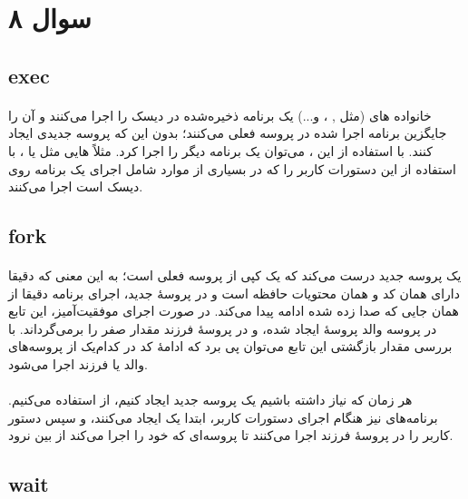 \documentclass{article}
\begin{document}
	\section*{سوال ۸}
	\subsection*{exec}
	\paragraph*{}
	خانواده
	های
	(مثل
	,
	،
	و...)
	یک برنامه ذخیره‌شده در دیسک را اجرا می‌کنند و آن را جایگزین برنامه اجرا شده در  پروسه فعلی می‌کنند؛ بدون این که پروسه جدیدی ایجاد کنند. با استفاده از این
	،
	می‌توان یک برنامه دیگر را اجرا کرد. مثلاً
	هایی
	مثل
	یا
	،
	با استفاده از این
	دستورات کاربر را که در بسیاری از موارد شامل اجرای یک برنامه روی دیسک است اجرا می‌کنند.

	\subsection*{fork}
	\paragraph*{}
	یک پروسه جدید درست می‌کند که یک کپی از پروسه فعلی است؛ به این معنی که دقیقا دارای همان کد و همان محتویات حافظه است و در پروسهٔ جدید، اجرای برنامه دقیقا از همان جایی که
	صدا زده شده ادامه پیدا می‌کند. در صورت اجرای موفقیت‌آمیز، این تابع در پروسه والد
	پروسهٔ ایجاد شده، و در پروسهٔ فرزند مقدار صفر را برمی‌گرداند. با بررسی مقدار بازگشتی این تابع می‌توان پی برد که ادامهٔ کد در کدام‌یک از پروسه‌های والد یا فرزند اجرا می‌شود.

	\paragraph*{}
	هر زمان که نیاز داشته باشیم یک پروسه جدید ایجاد کنیم، از
	استفاده می‌کنیم. برنامه‌های
	نیز هنگام اجرای دستورات کاربر، ابتدا یک
	ایجاد می‌کنند، و سپس دستور کاربر را در پروسهٔ فرزند اجرا می‌کنند تا پروسه‌ای که خود
	را اجرا می‌کند از بین نرود.

	\subsection*{wait}
\end{document}
